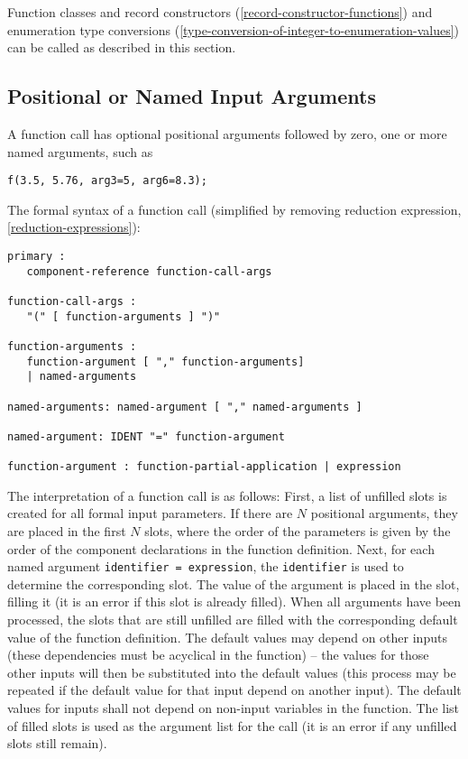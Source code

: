 Function classes and record constructors (\cref{record-constructor-functions}) and enumeration type
conversions (\cref{type-conversion-of-integer-to-enumeration-values}) can be called as described in this section.

\subsection{Positional or Named Input Arguments}\label{positional-or-named-input-arguments-of-functions}

A function call has optional positional arguments followed by zero, one
or more named arguments, such as

\begin{lstlisting}[language=modelica]
f(3.5, 5.76, arg3=5, arg6=8.3);
\end{lstlisting}

The formal syntax of a function call (simplified by removing reduction
expression, \cref{reduction-expressions}):
\begin{lstlisting}[language=grammar]
primary :
   component-reference function-call-args

function-call-args :
   "(" [ function-arguments ] ")"

function-arguments :
   function-argument [ "," function-arguments]
   | named-arguments

named-arguments: named-argument [ "," named-arguments ]

named-argument: IDENT "=" function-argument

function-argument : function-partial-application | expression
\end{lstlisting}

The interpretation of a function call is as follows: First, a list of unfilled slots is created for all formal input parameters.  If there are $N$ positional arguments, they are placed in the first
$N$ slots, where the order of the parameters is given by the order of the component declarations in the function definition.  Next, for each named argument \lstinline!identifier = expression!, the
\lstinline!identifier! is used to determine the corresponding slot.  The value of the argument is placed in the slot, filling it (it is an error if this slot is already filled).  When all arguments
have been processed, the slots that are still unfilled are filled with the corresponding default value of the function definition.  The default values may depend on other inputs (these dependencies
must be acyclical in the function) -- the values for those other inputs will then be substituted into the default values (this process may be repeated if the default value for that input depend on another input).  The default values for inputs shall not depend on non-input variables in the function.  The list of filled slots is used as the argument list for the call (it is an error if any
unfilled slots still remain).

